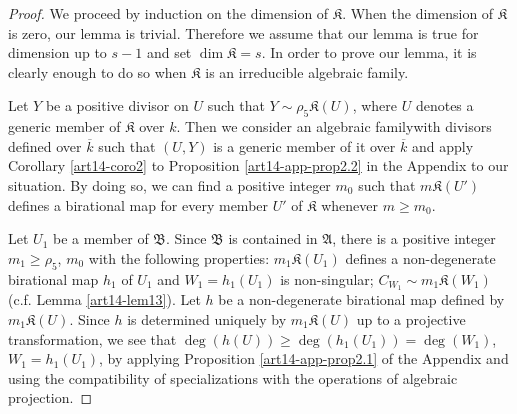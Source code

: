 \begin{proof}
We proceed by induction on the dimension of $\mathfrak{K}$. When the dimension of $\mathfrak{K}$ is zero, our lemma is trivial. Therefore we assume that our lemma is true for dimension up to $s-1$ and set $\dim \mathfrak{K}=s$. In order to prove our lemma, it is clearly enough to do so when $\mathfrak{K}$ is an irreducible algebraic family.

Let $Y$ be a positive divisor on $U$ such that $Y\sim \rho_{5}\mathfrak{K}(U)$, where $U$ denotes a generic member of $\mathfrak{K}$ over $k$. Then we consider an algebraic family\pageoriginale with divisors defined over $\overline{k}$ such that $(U,Y)$ is a generic member of it over $\overline{k}$ and apply Corollary \ref{art14-coro2} to Proposition \ref{art14-app-prop2.2} in the Appendix to our situation. By doing so, we can find a positive integer $m_{0}$ such that $m\mathfrak{K}(U')$ defines a birational map for every member $U'$ of $\mathfrak{K}$ whenever $m\geq m_{0}$.

Let $U_{1}$ be a member of $\mathfrak{B}$. Since $\mathfrak{B}$ is contained in $\mathfrak{A}$, there is a positive integer $m_{1}\geq \rho_{5}$, $m_{0}$ with the following properties: $m_{1}\mathfrak{K}(U_{1})$ defines a non-degenerate birational map $h_{1}$ of $U_{1}$ and $W_{1}=h_{1}(U_{1})$ is non-singular; $C_{W_{1}}\sim m_{1}\mathfrak{K}(W_{1})$ (c.f. Lemma \ref{art14-lem13}). Let $h$ be a non-degenerate birational map defined by $m_{1}\mathfrak{K}(U)$. Since $h$ is determined uniquely by $m_{1}\mathfrak{K}(U)$ up to a projective transformation, we see that $\deg(h(U))\geq \deg(h_{1}(U_{1}))=\deg (W_{1})$, $W_{1}=h_{1}(U_{1})$, by applying Proposition \ref{art14-app-prop2.1} of the Appendix and using the compatibility of specializations with the operations of algebraic projection.


\end{proof}
